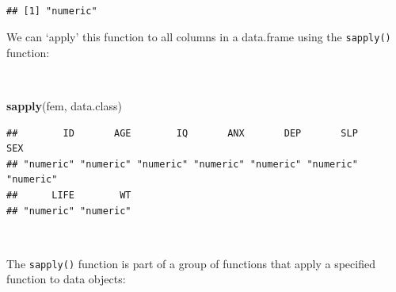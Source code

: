 \documentclass[12pt,a4paper]{book}
\newenvironment{Shaded}{\begin{snugshade}}{\end{snugshade}}
\newcommand{\KeywordTok}[1]{\textcolor[rgb]{0.13,0.29,0.53}{\textbf{#1}}}
\newcommand{\NormalTok}[1]{#1}
\newcommand{\OperatorTok}[1]{\textcolor[rgb]{0.81,0.36,0.00}{\textbf{#1}}}
\theoremstyle{definition}
\theoremstyle{definition}
\theoremstyle{definition}
\theoremstyle{remark}
\begin{document}
~

\begin{Shaded}
\end{Shaded}

\begin{verbatim}
## [1] "numeric"
\end{verbatim}

\newpage

We can `apply' this function to all columns in a data.frame using the
\texttt{sapply()} function:

~

\begin{Shaded}
\begin{Highlighting}[]
\KeywordTok{sapply}\NormalTok{(fem, data.class)}
\end{Highlighting}
\end{Shaded}

\begin{verbatim}
##        ID       AGE        IQ       ANX       DEP       SLP       SEX 
## "numeric" "numeric" "numeric" "numeric" "numeric" "numeric" "numeric" 
##      LIFE        WT 
## "numeric" "numeric"
\end{verbatim}

~

The \texttt{sapply()} function is part of a group of functions that
apply a specified function to data objects:
\end{document}
